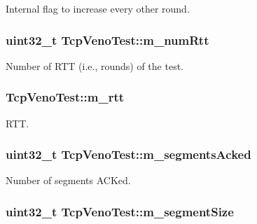 Internal flag to increase every other round. 

\subsubsection[{\texorpdfstring{m\+\_\+num\+Rtt}{m_numRtt}}]{\setlength{\rightskip}{0pt plus 5cm}uint32\+\_\+t Tcp\+Veno\+Test\+::m\+\_\+num\+Rtt\hspace{0.3cm}{\ttfamily [private]}}\hypertarget{classTcpVenoTest_a38d25d99a350ac0802bdb80052b4cfd9}{}\label{classTcpVenoTest_a38d25d99a350ac0802bdb80052b4cfd9}


Number of R\+TT (i.\+e., rounds) of the test. 

\subsubsection[{\texorpdfstring{m\+\_\+rtt}{m_rtt}}]{ Tcp\+Veno\+Test\+::m\+\_\+rtt\hspace{0.3cm}{\ttfamily [private]}}\hypertarget{classTcpVenoTest_a0e786084324c078f6a58b8fdf0d61b60}{}\label{classTcpVenoTest_a0e786084324c078f6a58b8fdf0d61b60}


R\+TT. 

\subsubsection[{\texorpdfstring{m\+\_\+segments\+Acked}{m_segmentsAcked}}]{\setlength{\rightskip}{0pt plus 5cm}uint32\+\_\+t Tcp\+Veno\+Test\+::m\+\_\+segments\+Acked\hspace{0.3cm}{\ttfamily [private]}}\hypertarget{classTcpVenoTest_a7614249ca9888a1a8361554990318a2b}{}\label{classTcpVenoTest_a7614249ca9888a1a8361554990318a2b}


Number of segments A\+C\+Ked. 

\subsubsection[{\texorpdfstring{m\+\_\+segment\+Size}{m_segmentSize}}]{\setlength{\rightskip}{0pt plus 5cm}uint32\+\_\+t Tcp\+Veno\+Test\+::m\+\_\+segment\+Size\hspace{0.3cm}{\ttfamily [private]}}\hypertarget{classTcpVenoTest_abd2a3231c1c2efc9aed967bc205a5ae2}{}\label{classTcpVenoTest_abd2a3231c1c2efc9aed967bc205a5ae2}


